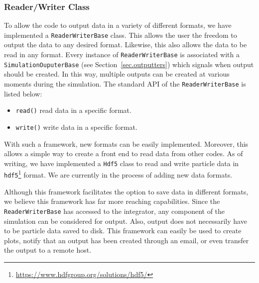\subsubsection{Reader/Writer Class}
To allow the code to output data in a variety of different formats, we have implemented 
a \lstinline{ReaderWriterBase} class. This allows the user the freedom to
output the data to any desired format. Likewise, this also allows the data to be
read in any format. Every instance of \lstinline{ReaderWriterBase} is associated with a 
\lstinline{SimulationOuputerBase} (see Section~\ref{sec.outputters}) which signals when
output should be created. In this way, multiple outputs can be created at various
moments during the simulation. The standard API of the \lstinline{ReaderWriterBase} is
listed below:
\begin{itemize}
	\item \lstinline{read()} read data in a specific format.
    \item \lstinline{write()} write data in a specific format.
\end{itemize}
With such a framework, new formats can be easily implemented. Moreover, this
allows a simple way to create a front end to read data from other codes. As of writing,
we have implemented a \lstinline{Hdf5} class to read and write particle data in
\texttt{hdf5}\footnote{\url{https://www.hdfgroup.org/solutions/hdf5/}} format. We are
currently in the process of adding new data formats.

Although this framework facilitates the option to save data in different formats,
we believe this framework has far more reaching capabilities. Since the \lstinline{ReaderWriterBase}
has accessed to the integrator, any component of the simulation can be considered for
output. Also, output does not necessarily have to be particle data saved to disk. This framework
can easily be used to create plots, notify that an output has been created through an
email, or even transfer the output to a remote host.

